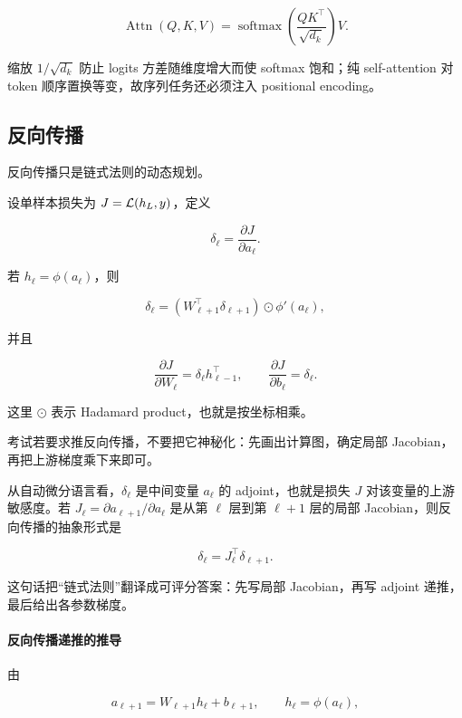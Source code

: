 \documentclass[11pt]{ctexart}
\begin{document}
\[
  \operatorname{Attn}(Q,K,V)=\operatorname{softmax}\!\left(\frac{QK^\top}{\sqrt{d_k}}\right)V.
\]

缩放 \(1/\sqrt{d_k}\) 防止 logits 方差随维度增大而使 softmax 饱和；纯 self-attention 对 token 顺序置换等变，故序列任务还必须注入 positional encoding。

\subsection{反向传播}


反向传播只是链式法则的动态规划。

\begin{definition}
设单样本损失为 \(J=\mathcal{L}(h_L,y)\)，定义

\[
  \delta_\ell=\frac{\partial J}{\partial a_\ell}.
\]
\end{definition}

若 \(h_\ell=\phi(a_\ell)\)，则

\[
  \delta_\ell
  =
  (W_{\ell+1}^\top \delta_{\ell+1})
  \odot
  \phi'(a_\ell),
\]

并且

\[
  \frac{\partial J}{\partial W_\ell}
  =
  \delta_\ell h_{\ell-1}^\top,
  \qquad
  \frac{\partial J}{\partial b_\ell}
  =
  \delta_\ell.
\]

这里 \(\odot\) 表示 Hadamard product，也就是按坐标相乘。

考试若要求推反向传播，不要把它神秘化：先画出计算图，确定局部 Jacobian，再把上游梯度乘下来即可。

从自动微分语言看，\(\delta_\ell\) 是中间变量 \(a_\ell\) 的 adjoint，也就是损失 \(J\) 对该变量的上游敏感度。若 \(J_\ell=\partial a_{\ell+1}/\partial a_\ell\) 是从第 \(\ell\) 层到第 \(\ell+1\) 层的局部 Jacobian，则反向传播的抽象形式是

\[
  \delta_\ell
  =
  J_\ell^\top \delta_{\ell+1}.
\]

这句话把“链式法则”翻译成可评分答案：先写局部 Jacobian，再写 adjoint 递推，最后给出各参数梯度。

\paragraph{反向传播递推的推导}

由

\[
  a_{\ell+1}=W_{\ell+1}h_\ell+b_{\ell+1},
  \qquad
  h_\ell=\phi(a_\ell),
\]
\end{document}
